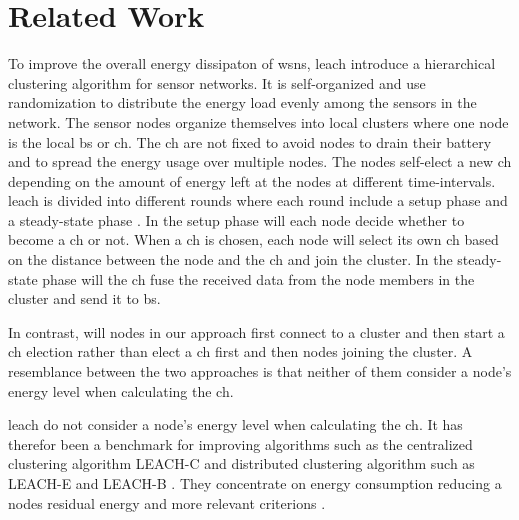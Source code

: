 \documentclass[USenglish]{uit-thesis}
\begin{document}
\chapter{Related Work} \label{chap:related_work}
To improve the overall energy dissipaton of \gls{wsn}s, \gls{leach} \cite{leach} introduce a hierarchical clustering algorithm for sensor networks. It is self-organized and use randomization to distribute the energy load evenly among the sensors in the network. The sensor nodes organize themselves into local clusters where one node is the local \gls{bs} or \gls{ch}. The \gls{ch} are not fixed to avoid nodes to drain their battery and to spread the energy usage over multiple nodes. The nodes self-elect a new \gls{ch} depending on the amount of energy left at the nodes at different time-intervals. \gls{leach} is divided into different rounds where each round include a setup phase and a steady-state phase \cite{tree_based}. In the setup phase will each node decide whether to become a \gls{ch} or not. When a \gls{ch} is chosen, each node will select its own \gls{ch} based on the distance between the node and the \gls{ch} and join the cluster. In the steady-state phase will the \gls{ch} fuse the received data from the node members in the cluster and send it to \gls{bs}.

In contrast, will nodes in our approach first connect to a cluster and then start a \gls{ch} election rather than elect a \gls{ch} first and then nodes joining the cluster. %
A resemblance between the two approaches is that neither of them consider a node's energy level when calculating the \gls{ch}.



\gls{leach} do not consider a node's energy level when calculating the \gls{ch}. It has therefor been a benchmark for improving algorithms such as the centralized clustering algorithm LEACH-C \cite {leach_c} and distributed clustering algorithm such as LEACH-E \cite{leach_e} and LEACH-B \cite{leach_b}. They concentrate on energy consumption reducing a nodes residual energy and more relevant criterions \cite{dec_cb_alg}.
\end{document}

